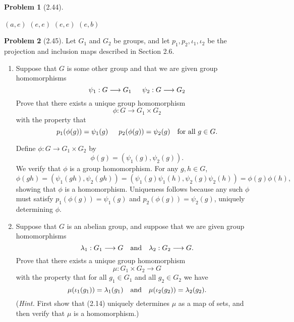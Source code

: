\documentclass[12pt]{article}
\theoremstyle{definition}
\newtheorem{problem}{Problem}
\begin{document}
\begin{problem}[2.44]
\begin{enumerate}[label=(\alph*)]
        \begin{solution} 
            \hspace{18px}$(a, e)$ \hspace{80px}$(e, e)$ \hspace{80px}$(e, e)$ \hspace{83px}$(e, b)$ 
        \end{solution}
    \end{enumerate}
\end{problem}

\begin{problem}[2.45]
    Let $G_1$ and $G_2$ be groups, and let $p_1, p_2, \iota_1, \iota_2$ be the projection and inclusion maps described in Section 2.6.
    \begin{enumerate}[label=(\alph*)]
        \item Suppose that $G$ is some other group and that we are given group homomorphisms
              \[ \psi_1 : G \longrightarrow G_1 \hspace{15px} \psi_2 : G \longrightarrow G_2 \]
              Prove that there exists a unique group homomorphism
              \[ \phi : G \longrightarrow G_1 \times G_2 \]
              with the property that
              \[ p_1(\phi(g)) = \psi_1(g) \hspace{15px} p_2(\phi(g)) = \psi_2(g) \hspace{10px} \text{for all } g \in G.\]
            
              \begin{solution}
                Define $\phi: G \to G_1 \times G_2$ by
                \[ \phi(g) = (\psi_1(g), \psi_2(g)). \]
                We verify that $\phi$ is a group homomorphism. For any $g, h \in G$,
                \[ \phi(gh) = (\psi_1(gh), \psi_2(gh)) = (\psi_1(g)\psi_1(h), \psi_2(g)\psi_2(h)) = \phi(g)\phi(h), \]
                showing that $\phi$ is a homomorphism. Uniqueness follows because any such $\phi$ must satisfy $p_1(\phi(g)) = \psi_1(g)$ and $p_2(\phi(g)) = \psi_2(g)$, uniquely determining $\phi$.

            \end{solution}
        \item Suppose that $G$ is an abelian group, and suppose that we are given group homomorphisms
              \[ \lambda_1 : G_1 \longrightarrow G \hspace{10px}\text{and}\hspace{10px} \lambda_2 : G_2 \longrightarrow G.\]
              Prove that there exists a unique group homomorphism
              \[ \mu : G_1 \times G_2 \longrightarrow G \]
              with the property that for all $g_1 \in G_1$ and all $g_2 \in G_2$ we have
              \[ \mu(\iota_1(g_1)) = \lambda_1(g_1) \hspace{10px}\text{and}\hspace{10px} \mu(\iota_2(g_2)) = \lambda_2(g_2). \]
              (\textit{Hint.} First show that (2.14) uniquely determines $\mu$ as a map of sets, and then verify that $\mu$ is a homomorphism.)


\end{enumerate}
\end{problem}
\end{document}
